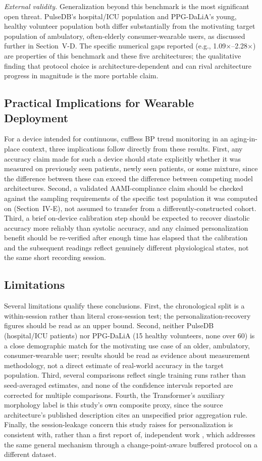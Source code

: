 \documentclass[journal]{IEEEtran}
\begin{document}
\textit{External validity.} Generalization beyond this benchmark is the most significant open threat. PulseDB's hospital/ICU population and PPG-DaLiA's young, healthy volunteer population both differ substantially from the motivating target population of ambulatory, often-elderly consumer-wearable users, as discussed further in Section~V-D. The specific numerical gaps reported (e.g., 1.09$\times$--2.28$\times$) are properties of this benchmark and these five architectures; the qualitative finding that protocol choice is architecture-dependent and can rival architecture progress in magnitude is the more portable claim.

\subsection{Practical Implications for Wearable Deployment}
For a device intended for continuous, cuffless BP trend monitoring in an aging-in-place context, three implications follow directly from these results. First, any accuracy claim made for such a device should state explicitly whether it was measured on previously seen patients, newly seen patients, or some mixture, since the difference between these can exceed the difference between competing model architectures. Second, a validated AAMI-compliance claim should be checked against the sampling requirements of the specific test population it was computed on (Section~IV-E), not assumed to transfer from a differently-constructed cohort. Third, a brief on-device calibration step should be expected to recover diastolic accuracy more reliably than systolic accuracy, and any claimed personalization benefit should be re-verified after enough time has elapsed that the calibration and the subsequent readings reflect genuinely different physiological states, not the same short recording session.

\subsection{Limitations}
Several limitations qualify these conclusions. First, the chronological split is a within-session rather than literal cross-session test; the personalization-recovery figures should be read as an upper bound. Second, neither PulseDB (hospital/ICU patients) nor PPG-DaLiA (15 healthy volunteers, none over 60) is a close demographic match for the motivating use case of an older, ambulatory, consumer-wearable user; results should be read as evidence about measurement methodology, not a direct estimate of real-world accuracy in the target population. Third, several comparisons reflect single training runs rather than seed-averaged estimates, and none of the confidence intervals reported are corrected for multiple comparisons. Fourth, the Transformer's auxiliary morphology label is this study's own composite proxy, since the source architecture's published description cites an unspecified prior aggregation rule. Finally, the session-leakage concern this study raises for personalization is consistent with, rather than a first report of, independent work \cite{tae2026}, which addresses the same general mechanism through a change-point-aware buffered protocol on a different dataset.
\end{document}
